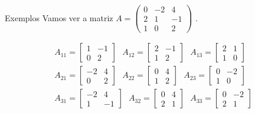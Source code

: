 \documentclass{beamer}
\begin{document}
\begin{frame}{Exemplos}
  Vamos ver a matriz $ A =\begin{pmatrix} 0 & -2 & 4 \\ 2 & 1 & -1  \\1 & 0 & 2 \end{pmatrix} $ .

\begin{gather*}
A_{11} = \begin{bmatrix}
  1 & -1 \\ 0 & 2
\end{bmatrix}\text{ }A_{12}=\begin{bmatrix}
  2 & -1 \\ 1 & 2
\end{bmatrix}\text{ }A_{13}=\begin{bmatrix}
  2 & 1 \\ 1 & 0
\end{bmatrix} \\
A_{21} = \begin{bmatrix}
  -2 & 4 \\ 0 & 2
\end{bmatrix}\text{ }A_{22}=\begin{bmatrix}
  0 & 4 \\ 1 & 2
\end{bmatrix}\text{ }A_{23}=\begin{bmatrix}
  0 & -2 \\ 1 & 0
\end{bmatrix} \\
A_{31} = \begin{bmatrix}
  -2 & 4 \\ 1 & -1
\end{bmatrix}\text{ }A_{32}=\begin{bmatrix}
  0 & 4 \\ 2 & {1}
\end{bmatrix}\text{ }A_{33}=\begin{bmatrix}
  0 & -2 \\ 2 & 1
\end{bmatrix}
\end{gather*}
\end{frame}
\end{document}
